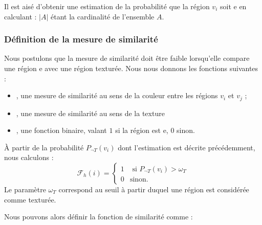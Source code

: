 Il est  aisé d'obtenir une estimation de la probabilité que la région $v_{i}$ soit e en calculant :
$|A|$ étant la cardinalité de l'ensemble $A$.

\subsubsection{Définition de la mesure de similarité}

Nous postulons que la mesure de similarité doit être faible lorsqu'elle compare une région e avec une région texturée. Nous nous donnons les fonctions suivantes :
\begin{itemize}
\item {}, une mesure de similarité  au sens de la couleur entre les régions $v_{i}$ et $v_{j}$ ;
\item {}, une mesure de similarité au sens de la texture 
\item {}, une fonction binaire, valant $1$ si la région  est e, $0$ sinon.
\end{itemize}
\begin{emodif}
À partir de la probabilité $P_{\neg T}(v_{i})$ dont l'estimation est décrite précédemment, nous calculons :
\begin{equation}
\mathcal{F}_{h}(i)=\begin{cases} 
1 &\text{ si }  P_{\neg T}(v_{i}) > \omega_{T}\\
0 & \text{sinon.}
\end{cases}
\end{equation}
Le  paramètre $\omega_{T}$ correspond au seuil à partir duquel une région est considérée comme texturée.\end{emodif} Nous pouvons alors définir la fonction de similarité  comme : 

